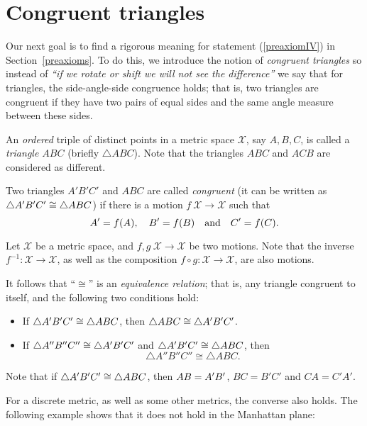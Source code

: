 \section{Congruent triangles}
\label{sec:cong-triangles}

Our next goal is to find a rigorous meaning for statement (\ref{preaxiomIV}) in Section~\ref{preaxioms}.
To do this, we introduce the notion of {}\emph{congruent triangles}
so instead of \textit{``if we rotate or shift we will not see the difference''} we say that for triangles, the side-angle-side congruence holds;
that is, two triangles are congruent if they have two pairs of equal sides and the same angle measure between these sides.

An {}\emph{ordered} triple of distinct points in a metric space $\mathcal{X}$, 
say $A,B,C$,
is called a \emph{triangle $ABC$}\label{page:def:triangle} (briefly $\triangle A B C$).
Note that the triangles $A B C$ and $A C B$ are considered as different.

Two triangles $A' B' C'$ and $A B C$ are called 
\emph{congruent}
(it can be written as $\triangle A' B' C'\z\cong\triangle A B C$) if there is a motion $f\:\mathcal{X}\to\mathcal{X}$ such that 
\[A'\z=f(A),
\quad
B'=f(B)
\quad
\text{and}
\quad
C'=f(C).\]

Let $\mathcal X$ be a metric space,
and $f,g\:\mathcal X\to\mathcal X$ be two motions.
Note that the inverse $f^{-1}:\mathcal X\to\mathcal X$,
as well as the composition $f\circ g:\mathcal X\to\mathcal X$,
are also motions.

It follows that ``$\cong$'' is an \emph{equivalence relation};
that is, any triangle congruent to itself, 
and the following two conditions hold:
\begin{itemize} 
\item If $\triangle A' B' C'\z\cong\triangle A B C$, then $\triangle A B C\z\cong\triangle A' B' C'$.
\item If $\triangle A'' B'' C''\z\cong\triangle A' B' C'$ and $\triangle A' B' C'\z\cong\triangle A B C$,
then 
$$\triangle A'' B'' C''\cong\triangle A B C.$$
\end{itemize}


Note that if $\triangle A' B' C'\z\cong\triangle A B C$,
then $AB\z=A'B'$,
$BC=B'C'$ and $CA=C'A'$.

For a discrete metric, as well as some other metrics, 
the converse also holds.
The following example shows that it does not hold in the Manhattan plane:

